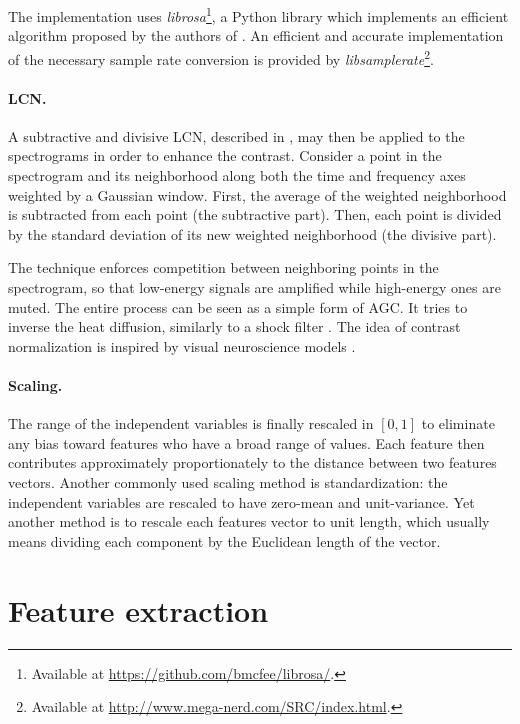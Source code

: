 The implementation uses \textit{librosa}\footnote{Available at \url{https://github.com/bmcfee/librosa/}.}, a Python library which implements an efficient algorithm proposed by the authors of \cite{schorkhuber2010CQTtoolbox}. An efficient and accurate implementation of the necessary sample rate conversion is provided by \textit{libsamplerate}\footnote{Available at \url{http://www.mega-nerd.com/SRC/index.html}.}.

\paragraph{\gls{LCN}.}
A subtractive and divisive \gls{LCN}, described in \cite{lecun2010LCN}, may then be applied to the spectrograms in order to enhance the contrast.
Consider a point in the spectrogram and its neighborhood along both the time and frequency axes weighted by a Gaussian window. First, the average of the weighted neighborhood is subtracted from each point (the subtractive part). Then, each point is divided by the standard deviation of its new weighted neighborhood (the divisive part).

The technique enforces competition between neighboring points in the spectrogram, so that low-energy signals are amplified while high-energy ones are muted. The entire process can be seen as a simple form of \gls{AGC}. It tries to inverse the heat diffusion, similarly to a shock filter \cite{osher1990shockFilters}. The idea of contrast normalization is inspired by visual neuroscience models \cite{lyu2008LCNneuro1, pinto2008LCNneuro2}.

\paragraph{Scaling.}
The range of the independent variables is finally rescaled in $[0,1]$ to eliminate any bias toward features who have a broad range of values. Each feature then contributes approximately proportionately to the distance between two features vectors. Another commonly used scaling method is standardization: the independent variables are rescaled to have zero-mean and unit-variance. Yet another method is to rescale each features vector to unit length, which usually means dividing each component by the Euclidean length of the vector.

\section{Feature extraction}

